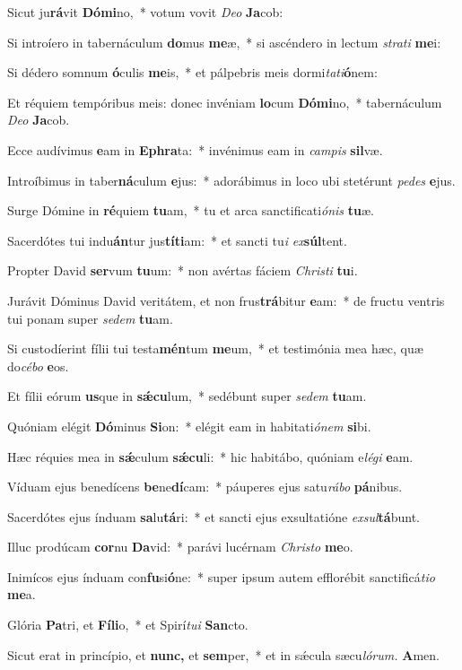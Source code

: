 \item Sicut ju\textbf{rá}vit \textbf{Dó}\textbf{mi}no,~* votum vovit \textit{Deo} \textbf{Ja}cob:
\item Si introíero in tabernáculum \textbf{do}mus \textbf{me}æ,~* si ascéndero in lectum \textit{strati} \textbf{me}i:
\item Si dédero somnum \textbf{ó}culis \textbf{me}is,~* et pálpebris meis dormi\textit{tati}\textbf{ó}nem:
\item Et réquiem tempóribus meis: donec invéniam \textbf{lo}cum \textbf{Dó}\textbf{mi}no,~* tabernáculum \textit{Deo} \textbf{Ja}cob.
\item Ecce audívimus \textbf{e}am in \textbf{E}\textbf{phra}ta:~* invénimus eam in \textit{campis} \textbf{sil}væ.
\item Introíbimus in taber\textbf{ná}culum \textbf{e}jus:~* adorábimus in loco ubi stetérunt \textit{pedes} \textbf{e}jus.
\item Surge Dómine in \textbf{ré}quiem \textbf{tu}am,~* tu et arca sanctificati\textit{ónis} \textbf{tu}æ.
\item Sacerdótes tui indu\textbf{án}tur jus\textbf{tí}\textbf{ti}am:~* et sancti tu\hspace{0.01em}\textit{i} \textit{ex}\textbf{súl}tent.
\item Propter David \textbf{ser}vum \textbf{tu}um:~* non avértas fáciem \textit{Christi} \textbf{tu}i.
\item Jurávit Dóminus David veritátem, et non frus\textbf{trá}bitur \textbf{e}am:~* de fru\-ctu ventris tui ponam super \textit{sedem} \textbf{tu}am.
\item Si custodíerint fílii tui testa\textbf{mén}tum \textbf{me}um,~* et testimónia mea hæc, quæ do\hspace{0.02em}\textit{cébo} \textbf{e}os.
\item Et fílii eórum \textbf{us}que in \textbf{sǽ}\textbf{cu}lum,~* sedébunt super \textit{sedem} \textbf{tu}am.
\item Quóniam elégit \textbf{Dó}minus \textbf{Si}on:~* elégit eam in habitati\hspace{0.01em}\textit{ónem} \textbf{si}bi.
\item Hæc réquies mea in \textbf{sǽ}culum \textbf{sǽ}\textbf{cu}li:~* hic habitábo, quóniam e\tinyhspace\textit{légi} \textbf{e}am.
\item Víduam ejus benedícens \textbf{be}ne\textbf{dí}cam:~* páuperes ejus satu\textit{rábo} \textbf{pá}nibus.
\item Sacerdótes ejus índuam \textbf{sa}lu\textbf{tá}ri:~* et sancti ejus exsultatióne \textit{exsul}\textbf{tá}bunt.
\item Illuc prodúcam \textbf{cor}nu \textbf{Da}vid:~* parávi lucérnam \textit{Christo} \textbf{me}o.
\item Inimícos ejus índuam con\textbf{fu}si\textbf{ó}ne:~* super i\-psum autem efflorébit san\-ctificá\tinyhspace\textit{tio} \textbf{me}a.
\item Glória \textbf{Pa}tri, et \textbf{Fí}\textbf{li}o,~* et Spirí\tinyhspace\textit{tui} \textbf{San}cto.
\item Sicut erat in princípio, et \textbf{nunc,} et \textbf{sem}per,~* et in sǽcula sæcu\tinyhspace\textit{lórum.} \textbf{A}men.
